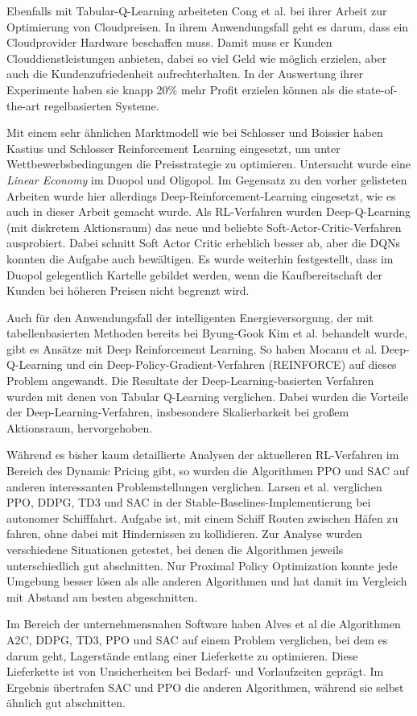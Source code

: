 Ebenfalls mit Tabular-Q-Learning arbeiteten Cong et al. bei ihrer Arbeit zur Optimierung von Cloudpreisen. \cite{9086147}
In ihrem Anwendungsfall geht es darum, dass ein Cloudprovider Hardware beschaffen muss.
Damit muss er Kunden Clouddienstleistungen anbieten, dabei so viel Geld wie möglich erzielen, aber auch die Kundenzufriedenheit aufrechterhalten.
In der Auswertung ihrer Experimente haben sie knapp 20\% mehr Profit erzielen können als die state-of-the-art regelbasierten Systeme.

Mit einem sehr ähnlichen Marktmodell wie bei Schlosser und Boissier haben Kastius und Schlosser \cite{Kastius2022} Reinforcement Learning eingesetzt, um unter Wettbewerbsbedingungen die Preisstrategie zu optimieren.
Untersucht wurde eine \textit{Linear Economy} im Duopol und Oligopol.
Im Gegensatz zu den vorher gelisteten Arbeiten wurde hier allerdings Deep-Reinforcement-Learning eingesetzt, wie es auch in dieser Arbeit gemacht wurde.
Als RL-Verfahren wurden Deep-Q-Learning (mit diskretem Aktionsraum) das neue und beliebte Soft-Actor-Critic-Verfahren ausprobiert.
Dabei schnitt Soft Actor Critic erheblich besser ab, aber die DQNs konnten die Aufgabe auch bewältigen.
Es wurde weiterhin festgestellt, dass im Duopol gelegentlich Kartelle gebildet werden, wenn die Kaufbereitschaft der Kunden bei höheren Preisen nicht begrenzt wird.

Auch für den Anwendungsfall der intelligenten Energieversorgung, der mit tabellenbasierten Methoden bereits bei Byung-Gook Kim et al. behandelt wurde, gibt es Ansätze mit Deep Reinforcement Learning.
So haben Mocanu et al. Deep-Q-Learning und ein Deep-Policy-Gradient-Verfahren (REINFORCE) auf dieses Problem angewandt.
Die Resultate der Deep-Learning-basierten Verfahren wurden mit denen von Tabular Q-Learning verglichen.
Dabei wurden die Vorteile der Deep-Learning-Verfahren, insbesondere Skalierbarkeit bei großem Aktionsraum, hervorgehoben.

Während es bisher kaum detaillierte Analysen der aktuelleren RL-Verfahren im Bereich des Dynamic Pricing gibt, so wurden die Algorithmen PPO und SAC auf anderen interessanten Problemstellungen verglichen.
Larsen et al. verglichen PPO, DDPG, TD3 und SAC in der Stable-Baselines-Implementierung bei autonomer Schifffahrt.
Aufgabe ist, mit einem Schiff Routen zwischen Häfen zu fahren, ohne dabei mit Hindernissen zu kollidieren.
Zur Analyse wurden verschiedene Situationen getestet, bei denen die Algorithmen jeweils unterschiedlich gut abschnitten.
Nur Proximal Policy Optimization konnte jede Umgebung besser lösen als alle anderen Algorithmen und hat damit im Vergleich mit Abstand am besten abgeschnitten.

Im Bereich der unternehmensnahen Software haben Alves et al \cite{10.1007/978-3-030-87897-9_21} die Algorithmen A2C, DDPG, TD3, PPO und SAC auf einem Problem verglichen, bei dem es darum geht, Lagerstände entlang einer Lieferkette zu optimieren.
Diese Lieferkette ist von Unsicherheiten  bei Bedarf- und Vorlaufzeiten geprägt.
Im Ergebnis übertrafen SAC und PPO die anderen Algorithmen, während sie selbst ähnlich gut abschnitten.